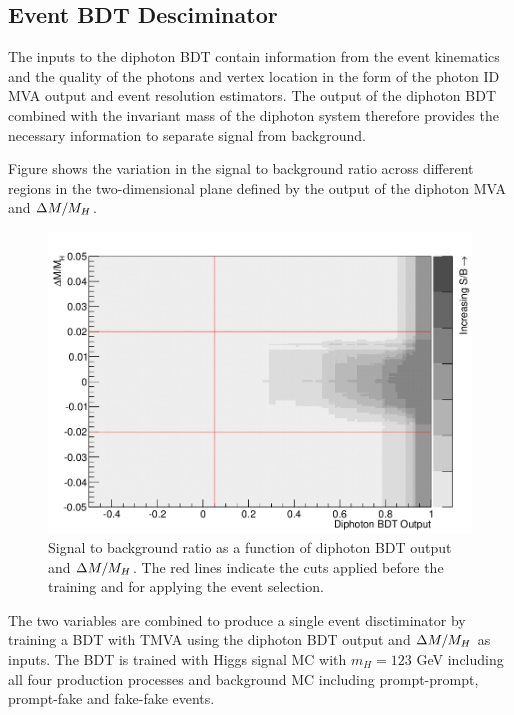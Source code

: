 \subsection{Event BDT Desciminator}

The inputs to the diphoton BDT contain information from the event kinematics and the quality of the photons 
and vertex location in the form of the photon ID MVA output and event resolution estimators. 
The output of the diphoton BDT combined with the invariant mass of the diphoton system therefore provides 
the necessary information to separate signal from background.

Figure
shows the variation in the signal to background ratio across different regions in the 
two-dimensional plane defined by the output of the diphoton MVA and $\Delta M/M_{H}$.

\begin{figure}
 \begin{centering}
  \includegraphics[width=\textwidth]{hgg7TeV/sidebandMvaPlots/bdt2dplot.png}
 \end{centering}
 \caption{Signal to background ratio as a function of diphoton BDT output and $\Delta M/M_{H}$.
 The red lines indicate the cuts applied before the training and for applying the event selection.}
 \label{fig:bdtplane}
\end{figure}

The two variables are combined to produce a single event disctiminator by training a BDT with TMVA using the diphoton BDT output and $\Delta M/M_{H}$ as inputs.
The BDT is trained with Higgs signal MC with $m_{H}=123$ GeV including all four production processes and background MC including prompt-prompt, prompt-fake
and fake-fake events.

